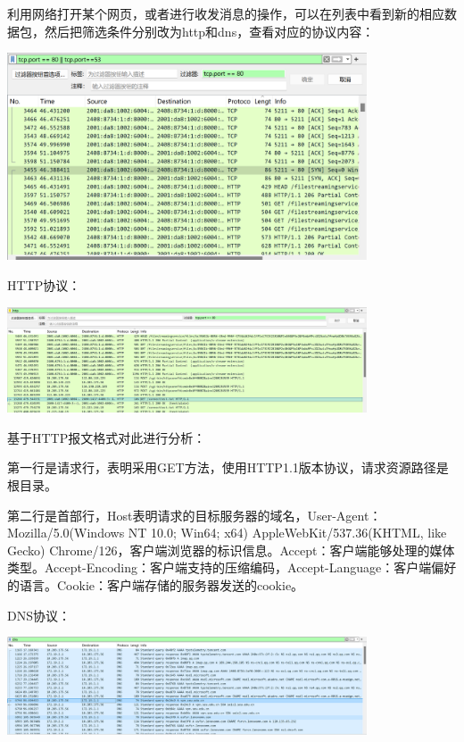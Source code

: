 \documentclass{article}
\begin{document}
利用网络打开某个网页，或者进行收发消息的操作，可以在列表中看到新的相应数据包，然后把筛选条件分别改为http和dns，查看对应的协议内容：

\vspace{10pt}
\centerline{\includegraphics[width=0.8\textwidth]{1_1_images/8.png}}
\vspace{10pt}
HTTP协议：

\vspace{10pt}
\centerline{\includegraphics[width=0.8\textwidth]{1_1_images/9.png}}
\vspace{10pt}
基于HTTP报文格式对此进行分析：

第一行是请求行，表明采用GET方法，使用HTTP1.1版本协议，请求资源路径是根目录。

第二行是首部行，Host表明请求的目标服务器的域名，User-Agent：Mozilla/5.0(Windows NT 10.0; Win64; x64) AppleWebKit/537.36(KHTML, like Gecko) Chrome/126，客户端浏览器的标识信息。Accept：客户端能够处理的媒体类型。Accept-Encoding：客户端支持的压缩编码，Accept-Language：客户端偏好的语言。Cookie：客户端存储的服务器发送的cookie。

DNS协议：

\vspace{10pt}
\centerline{\includegraphics[width=0.8\textwidth]{1_1_images/10.png}}
\vspace{10pt}
\end{document}
